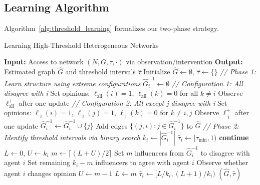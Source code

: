 \documentclass[conference]{IEEEtran}
\begin{document}
\subsection{Learning Algorithm}

Algorithm~\ref{alg:threshold_learning} formalizes our two-phase strategy.

\begin{algorithm}[t]
\caption{Learning High-Threshold Heterogeneous Networks}
\label{alg:threshold_learning}
\begin{algorithmic}[1]
\State \textbf{Input:} Access to network $(N, G, \tau, \cdot)$ via observation/intervention
\State \textbf{Output:} Estimated graph $\hat{G}$ and threshold intervals $\hat{\tau}$
\State Initialize $\hat{G} \leftarrow \emptyset$, $\hat{\tau} \leftarrow \{\}$
\State
\State \textit{// Phase 1: Learn structure using extreme configurations}
    \State $\hat{G}^{-1}_i \leftarrow \emptyset$
        \State \textit{// Configuration 1: All disagree with i}
        \State Set opinions: $\ell_{\text{all}}(i) = 1$, $\ell_{\text{all}}(k) = 0$ for all $k \neq i$
        \State Observe $\ell^+_{\text{all}}$ after one update
        \State
        \State \textit{// Configuration 2: All except j disagree with i}
        \State Set opinions: $\ell_{\text{-j}}(i) = 1$, $\ell_{\text{-j}}(j) = 1$, $\ell_{\text{-j}}(k) = 0$ for $k \neq i, j$
        \State Observe $\ell^+_{\text{-j}}$ after one update
        \State
            \State $\hat{G}^{-1}_i \leftarrow \hat{G}^{-1}_i \cup \{j\}$ 
        \EndIf
    \EndFor
    \State Add edges $\{(j, i) : j \in \hat{G}^{-1}_i\}$ to $\hat{G}$
\EndFor
\State
\State \textit{// Phase 2: Identify threshold intervals via binary search}
    \State $k_i \leftarrow |\hat{G}^{-1}_i|$
        \State $\hat{\tau}_i \leftarrow [\tau_{\min}, 1)$ 
        \State \textbf{continue}
    \EndIf
    \State
    \State $L \leftarrow 0$, $U \leftarrow k_i$ 
        \State $m \leftarrow \lceil (L + U) / 2 \rceil$
        \State Set $m$ influencers from $\hat{G}^{-1}_i$ to disagree with agent $i$
        \State Set remaining $k_i - m$ influencers to agree with agent $i$
        \State Observe whether agent $i$ changes opinion
            \State $U \leftarrow m - 1$ 
        \Else
            \State $L \leftarrow m$ 
        \EndIf
    \EndWhile
    \State $\hat{\tau}_i \leftarrow [L/k_i, (L+1)/k_i)$ 
\EndFor
\State \Return $(\hat{G}, \hat{\tau})$
\end{algorithmic}
\end{algorithm}
\end{document}

